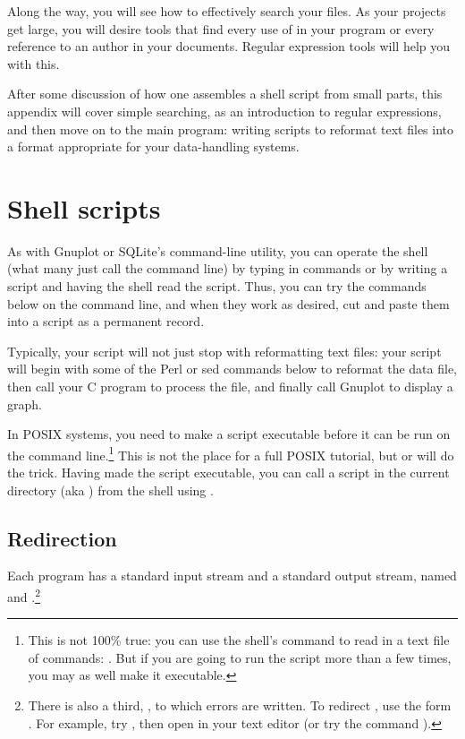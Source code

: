 Along the way, you will see how to effectively search your files. As
your projects get large, you will desire tools that find every use of
 in your program or every reference to an author in
your documents. Regular expression tools will help you with this.

After some discussion of how one assembles a shell script from small
parts, this appendix will cover simple searching, as an introduction to
regular expressions, and then move on to the main program: writing
scripts to reformat text files into a format appropriate for your
data-handling systems.

\section{Shell scripts} As with Gnuplot or SQLite's command-line
utility, you can operate the shell (what many just call the command line)
by typing in commands or by writing a script and having the shell read
the script. Thus, you can try the commands below on the command line,
and when they work as desired, cut and paste them into a script as a permanent
record. 

Typically, your script will not just stop with reformatting text files:
your script will begin with some of the Perl or sed commands below to
reformat the data file, then call your C program to process the file, and
finally call Gnuplot to display a graph. 

In POSIX systems, you need to make a script executable before it can be
run on the command line.\footnote{This is not 100\% true: you can use
the shell's  command to read in a text file of commands:
. But if you are going to run the script more than a
few times, you may as well make it executable.} This is not the place
for a full POSIX tutorial, but  or  will do the trick. Having made the script executable, you
can call a script in the current directory (aka ) from the shell
using .

\subsection{Redirection} 
Each program has a standard input stream
and a standard output stream, named  and
.\footnote{There is also a third, , to which
errors are written. To redirect , use the form \bi{\&>}. For
example, try , then open  in your text editor
(or try the command ).}

